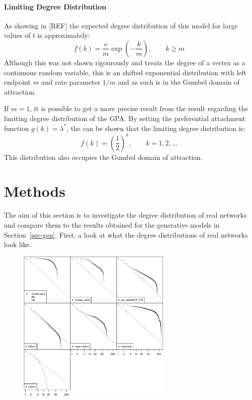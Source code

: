 \documentclass[
  10pt,
  a4paper,
]{scrreprt}
\theoremstyle{plain}
\theoremstyle{plain}
\theoremstyle{plain}
\theoremstyle{definition}
\theoremstyle{remark}
\begin{document}
{\hypertarget{limiting-degree-distribution-1}{%
\subsubsection{Limiting Degree
Distribution}\label{limiting-degree-distribution-1}}

As showing in {[}REF{]} the expected degree distribution of this model
for large values of \(t\) is approximately: \[
f(k) = \displaystyle\frac{e}{m}\exp\left(-\displaystyle\frac{k}{m}\right),\qquad k \ge m
\] Although this was not shown rigourously and treats the degree of a
vertex as a continuous random variable, this is an shifted exponential
distribution with left endpoint \(m\) and rate parameter \(1/m\) and as
such is in the Gumbel domain of attraction.

If \(m=1\), it is possible to get a more precise result from the result
regarding the limiting degree distribution of the GPA. By setting the
preferential attachment function \(g(k) = \lambda^*\), the can be shown
that the limiting degree distribution is: \[
f(k) = \left(\frac{1}{2} \right)^{k}, \qquad k=1,2,\ldots 
\] This distribution also occupies the Gumbel domain of attraction.

\hypertarget{sec-meth}{%
\chapter{Methods}\label{sec-meth}}

The aim of this section is to investigate the degree distribution of
real networks and compare them to the results obtained for the
generative models in Section~\ref{sec-gen}. First, a look at what the
degree distributions of real networks look like.

\begin{figure}[H]

{\centering \includegraphics[width=0.66\textwidth,height=\textheight]{doc_files/figure-pdf/fig-survs-1.pdf}

}
\end{figure}}
\end{document}
